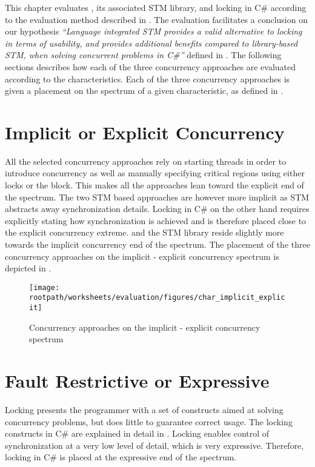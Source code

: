 \makeatletter {}\makeatother
{}
This chapter evaluates \stmname, its associated \ac{STM} library, and locking in C\# according to the evaluation method described in . The evaluation facilitates a conclusion on our hypothesis \textit{``Language integrated \ac{STM} provides a valid alternative to locking in terms of usability, and provides additional benefits compared to library-based \ac{STM}, when solving concurrent problems in C\#''} defined in .
\label{chap:evaluation}
The following sections describes how each of the three concurrency approaches are evaluated according to the characteristics. Each of the three concurrency approaches is given a placement on the spectrum of a given characteristic, as defined in .

\section{Implicit or Explicit Concurrency}
All the selected concurrency approaches rely on starting threads in order to introduce concurrency as well as manually specifying critical regions using either locks or the  block. This makes all the approaches lean toward the explicit end of the spectrum. The two \ac{STM} based approaches are however more implicit as \ac{STM} abstracts away synchronization details. Locking in C\# on the other hand requires explicitly stating how synchronization is achieved and is therefore placed close to the explicit concurrency extreme. \stmnamesp and the \ac{STM} library reside slightly more towards the implicit concurrency end of the spectrum. The placement of the three concurrency approaches on the implicit - explicit concurrency spectrum is depicted in .

\begin{figure}[htbp]
\centering
\texttt{[image: \\rootpath/worksheets/evaluation/figures/char\_implicit\_explicit]}
\caption{Concurrency approaches on the implicit - explicit concurrency spectrum}
\label{fig:char_implicit_explicit}
\end{figure}

\section{Fault Restrictive or Expressive}
Locking presents the programmer with a set of constructs aimed at solving concurrency problems, but does little to guarantee correct usage. The locking constructs in C\# are explained in detail in . Locking enables control of synchronization at a very low level of detail, which is very expressive. Therefore, locking in C\# is placed at the expressive end of the spectrum.

